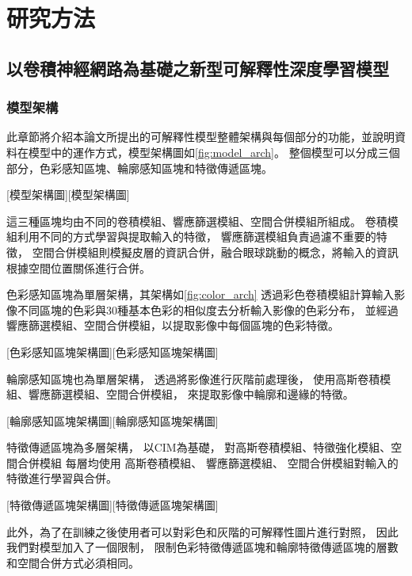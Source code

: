 \documentclass[class=NCU_thesis, crop=false]{standalone}
\begin{document}
\chapter{研究方法}

\section{以卷積神經網路為基礎之新型可解釋性深度學習模型}
\subsection{模型架構}

此章節將介紹本論文所提出的可解釋性模型整體架構與每個部分的功能，並說明資料在模型中的運作方式，模型架構圖如\cref{fig:model_arch}。
整個模型可以分成三個部分，色彩感知區塊、輪廓感知區塊和特徵傳遞區塊。

[模型架構圖][模型架構圖]

\pagebreak

這三種區塊均由不同的卷積模組、響應篩選模組、空間合併模組所組成。
卷積模組利用不同的方式學習與提取輸入的特徵，
響應篩選模組負責過濾不重要的特徵，
空間合併模組則模擬皮層的資訊合併，融合眼球跳動的概念，將輸入的資訊根據空間位置關係進行合併。

色彩感知區塊為單層架構，其架構如\cref{fig:color_arch}
透過彩色卷積模組計算輸入影像不同區塊的色彩與30種基本色彩的相似度去分析輸入影像的色彩分布，
並經過響應篩選模組、空間合併模組，以提取影像中每個區塊的色彩特徵。

[色彩感知區塊架構圖][色彩感知區塊架構圖]

輪廓感知區塊也為單層架構，
透過將影像進行灰階前處理後，
使用高斯卷積模組、響應篩選模組、空間合併模組，
來提取影像中輪廓和邊緣的特徵。

[輪廓感知區塊架構圖][輪廓感知區塊架構圖]

特徵傳遞區塊為多層架構，
以CIM為基礎，
對高斯卷積模組、特徵強化模組、空間合併模組
每層均使用
高斯卷積模組、
響應篩選模組、
空間合併模組對輸入的特徵進行學習與合併。

[特徵傳遞區塊架構圖][特徵傳遞區塊架構圖]

此外，為了在訓練之後使用者可以對彩色和灰階的可解釋性圖片進行對照，
因此我們對模型加入了一個限制，
限制色彩特徵傳遞區塊和輪廓特徵傳遞區塊的層數和空間合併方式必須相同。

\pagebreak
\end{document}
